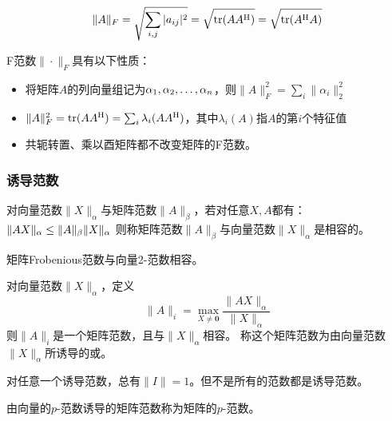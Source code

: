 \begin{definition}[Frobenious范数]
    \[
        \|A\|_F=\sqrt{\sum_{i,j}|a_{ij}|^2}=\sqrt{\operatorname{tr}(AA^\mathrm{H})}=\sqrt{\operatorname{tr}(A^\mathrm{H} A)}
    \]
\end{definition}

\begin{property}
    F范数$\|\cdot\|_F$具有以下性质：
    \begin{itemize}
        \item 将矩阵$A$的列向量组记为$\VectorComma{\alpha}{n}$，则$\|A\|_F^2=\sum\limits_i \|\alpha_i\|_2^2$
        \item $\|A\|_F^2=\operatorname{tr}(AA^\mathrm{H})=\sum_i \lambda_i(AA^\mathrm{H})$，其中$\lambda_i(A)$指$A$的第$i$个特征值
        \item 共轭转置、乘以酉矩阵都不改变矩阵的F范数。
    \end{itemize}
\end{property}

\subsubsection{诱导范数}

\begin{definition}[矩阵范数和向量范数相容]
    对向量范数$\|X\|_\alpha$与矩阵范数$\|A\|_\beta$，若对任意$X,A$都有：
    $\|AX\|_\alpha\linebreak[1] \leq \|A\|_\beta \|X\|_\alpha$
    则称矩阵范数$\|A\|_{\beta}$与向量范数$\|X\|_\alpha$是相容的。
\end{definition}

\begin{theorem}
    矩阵Frobenious范数与向量2-范数相容。
\end{theorem}

\begin{definition}[诱导范数]
    对向量范数$\|X\|_\alpha$，定义
    \[
        \|A\|_i = \max_{X\neq \bm{0}} \frac{\|AX\|_\alpha}{\|X\|_\alpha}
    \]
    则$\|A\|_i$是一个矩阵范数，且与$\|X\|_\alpha$相容。
    称这个矩阵范数为由向量范数$\|X\|_\alpha$所诱导的或。
\end{definition}

对任意一个诱导范数，总有$\|I\|=1$。但不是所有的范数都是诱导范数。

\begin{definition}[矩阵$p$-范数]
    由向量的$p$-范数诱导的矩阵范数称为矩阵的$p$-范数。
\end{definition}


